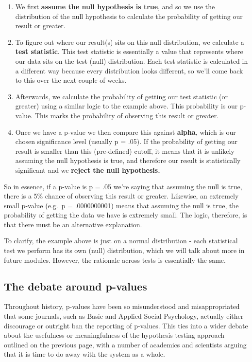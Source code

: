 \documentclass[
]{book}
\providecommand{\tightlist}{%
  \setlength{\itemsep}{0pt}\setlength{\parskip}{0pt}}
\begin{document}
\begin{enumerate}
\def\labelenumi{\arabic{enumi}.}
\tightlist
\item
  We first \textbf{assume the null hypothesis is true}, and so we use the distribution of the null hypothesis to calculate the probability of getting our result or greater.
\item
  To figure out where our result(s) sits on this null distribution, we calculate a \textbf{test statistic}. This test statistic is essentially a value that represents where our data sits on the test (null) distribution. Each test statistic is calculated in a different way because every distribution looks different, so we'll come back to this over the next couple of weeks.
\item
  Afterwards, we calculate the probability of getting our test statistic (or greater) using a similar logic to the example above. This probability is our p-value. This marks the probability of observing this result or greater.
\item
  Once we have a p-value we then compare this against \textbf{alpha}, which is our chosen significance level (usually p = .05). If the probability of getting our result is smaller than this (pre-defined) cutoff, it means that it is unlikely assuming the null hypothesis is true, and therefore our result is statistically significant and we \textbf{reject the null hypothesis. }
\end{enumerate}

So in essence, if a p-value is p = .05 we're saying that assuming the null is true, there is a 5\% chance of observing this result or greater. Likewise, an extremely small p-value (e.g.~p = .0000000001) means that assuming the null is true, the probability of getting the data we have is extremely small. The logic, therefore, is that there must be an alternative explanation.

To clarify, the example above is just on a normal distribution - each statistical test we perform has its own (null) distribution, which we will talk about more in future modules. However, the rationale across tests is essentially the same.

\subsection{The debate around p-values}\label{the-debate-around-p-values}

Throughout history, p-values have been so misunderstood and misappropriated that some journals, such as Basic and Applied Social Psychology, actually either discourage or outright ban the reporting of p-values. This ties into a wider debate about the usefulness or meaningfulness of the hypothesis testing approach outlined on the previous page, with a number of academics and scientists arguing that it is time to do away with the system as a whole.
\end{document}
